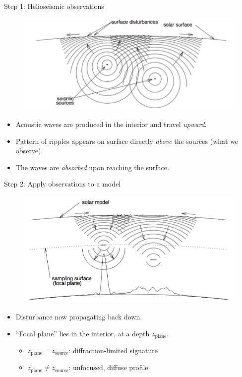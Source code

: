 \documentclass{beamer}
\begin{document}
\begin{frame}{Step 1: Helioseismic observations}
    \begin{figure}
        \includegraphics[width=\textwidth]{fig_1.pdf}
    \end{figure}
    \begin{itemize}
        \item Acoustic waves are produced in the interior
        and travel \emph{upward}.
        \item Pattern of ripples appears on surface
            directly \emph{above} the sources (what we observe).
        \item The waves are \emph{absorbed} upon reaching the surface.
    \end{itemize}
\end{frame}
\begin{frame}{Step 2: Apply observations to a model}
    \begin{figure}
        \includegraphics[width=\textwidth]{fig_2.png}
    \end{figure}
    \begin{itemize}
        \item Disturbance now propagating back down.
        \item ``Focal plane'' lies in the interior, at a depth
            $z_{\textrm{plane}}$.
    \begin{itemize}
        \item $z_{\textrm{plane}} = z_{\textrm{source}}$:
            diffraction-limited signature
        \item $z_{\textrm{plane}} \neq z_{\textrm{source}}$:
            unfocused, diffuse profile
    \end{itemize}
    \end{itemize}
\end{frame}
\end{document}
